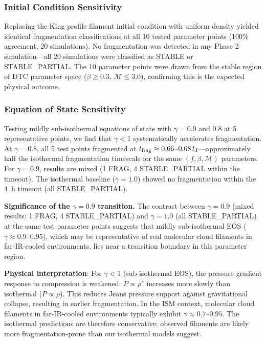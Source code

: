 \documentclass[twocolumn]{mnras}
\begin{document}
\subsubsection{Initial Condition Sensitivity}

Replacing the King-profile filament initial condition with uniform density yielded identical fragmentation classifications at all 10 tested parameter points (100\% agreement, 20 simulations). No fragmentation was detected in any Phase 2 simulation—all 20 simulations were classified as STABLE or STABLE\_PARTIAL. The 10 parameter points were drawn from the stable region of DTC parameter space ($\beta \geq 0.3$, $\mathcal{M} \leq 3.0$), confirming this is the expected physical outcome.

\subsubsection{Equation of State Sensitivity}

Testing mildly sub-isothermal equations of state with $\gamma = 0.9$ and $0.8$ at 5 representative points, we find that $\gamma < 1$ systematically accelerates fragmentation. At $\gamma = 0.8$, all 5 test points fragmented at $t_{\rm frag} \approx 0.66$--$0.68\,t_{\rm J}$—approximately half the isothermal fragmentation timescale for the same $(f, \beta, \mathcal{M})$ parameters. For $\gamma = 0.9$, results are mixed (1 FRAG, 4 STABLE\_PARTIAL within the timeout). The isothermal baseline ($\gamma = 1.0$) showed no fragmentation within the 4~h timeout (all STABLE\_PARTIAL).

\textbf{Significance of the $\gamma = 0.9$ transition.}
The contrast between $\gamma = 0.9$ (mixed results: 1 FRAG, 4 STABLE\_PARTIAL) and $\gamma = 1.0$ (all STABLE\_PARTIAL) at the same test parameter points suggests that mildly sub-isothermal EOS ($\gamma \approx 0.9$--$0.95$), which may be representative of real molecular cloud filaments in far-IR-cooled environments, lies near a transition boundary in this parameter region.

\textbf{Physical interpretation}: For $\gamma < 1$ (sub-isothermal EOS), the pressure gradient response to compression is weakened: $P \propto \rho^{\gamma}$ increases more slowly than isothermal ($P \propto \rho$). This reduces Jeans pressure support against gravitational collapse, resulting in earlier fragmentation. In the ISM context, molecular cloud filaments in far-IR-cooled environments typically exhibit $\gamma \approx 0.7$--$0.95$. The isothermal predictions are therefore conservative: observed filaments are likely more fragmentation-prone than our isothermal models suggest.
\end{document}
